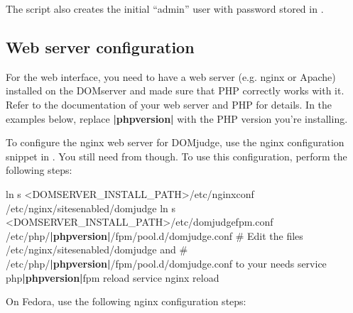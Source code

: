 \documentclass[a4paper,10pt,english,openany]{sphinxmanual}
\begin{document}
\sphinxAtStartPar
The script also creates the initial “admin” user with password
stored in .


\subsection{Web server configuration}
\label{\detokenize{install-domserver:web-server-configuration}}
\sphinxAtStartPar
For the web interface, you need to have a web server (e.g. nginx or Apache)
installed on the DOMserver and made sure that PHP correctly works
with it. Refer to the documentation of your web server and PHP for
details. In the examples below, replace {\color{red}\bfseries{}|phpversion|} with the PHP version
you’re installing.

\sphinxAtStartPar
To configure the nginx web server for DOMjudge, use the nginx configuration snippet in
.  You still need  from 
though. To use this configuration, perform the following steps:
\begin{sphinxalltt}
ln \sphinxhyphen{}s \textless{}DOMSERVER\_INSTALL\_PATH\textgreater{}/etc/nginx\sphinxhyphen{}conf /etc/nginx/sites\sphinxhyphen{}enabled/domjudge
ln \sphinxhyphen{}s \textless{}DOMSERVER\_INSTALL\_PATH\textgreater{}/etc/domjudge\sphinxhyphen{}fpm.conf /etc/php/{\color{red}\bfseries{}|phpversion|}/fpm/pool.d/domjudge.conf
\# Edit the files /etc/nginx/sites\sphinxhyphen{}enabled/domjudge and
\# /etc/php/{\color{red}\bfseries{}|phpversion|}/fpm/pool.d/domjudge.conf to your needs
service php{\color{red}\bfseries{}|phpversion|}\sphinxhyphen{}fpm reload
service nginx reload
\end{sphinxalltt}

\sphinxAtStartPar
On Fedora, use the following nginx configuration steps:
\end{document}
